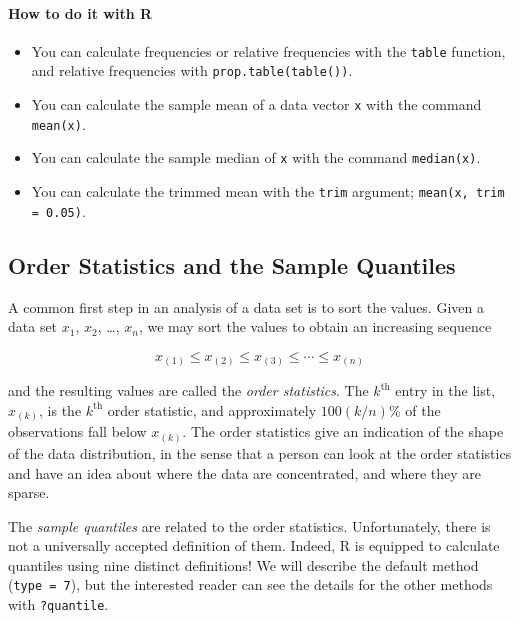 \documentclass[captions=tableheading]{scrbook}
\begin{document}
\paragraph*{How to do it with \textsf{R}}

\begin{itemize}
\item You can calculate frequencies or relative frequencies with the \texttt{table} function, and relative frequencies with \texttt{prop.table(table())}. \item You can calculate the sample mean of a data vector \texttt{x} with the command \texttt{mean(x)}.
\item You can calculate the sample median of \texttt{x} with the command \texttt{median(x)}. \item You can calculate the trimmed mean with the \texttt{trim} argument; \texttt{mean(x, trim = 0.05)}.
\end{itemize}
\subsection{Order Statistics and the Sample Quantiles}
\label{sec-2-3-3}

\label{sub:Order-Statistics-and}

A common first step in an analysis of a data set is to sort the values. Given a data set \(x_{1}\), \(x_{2}\), \ldots{}, \(x_{n}\), we may sort the values to obtain an increasing sequence

\begin{equation} 
x_{(1)}\leq x_{(2)}\leq x_{(3)}\leq\cdots\leq x_{(n)}
\end{equation}

and the resulting values are called the \emph{order statistics}. The \(k^{\mathrm{th}}\) entry in the list, \(x_{(k)}\), is the \(k^{\mathrm{th}}\) order statistic, and approximately \(100(k/n)\)\% of the observations fall below \(x_{(k)}\). The order statistics give an indication of the shape of the data distribution, in the sense that a person can look at the order statistics and have an idea about where the data are concentrated, and where they are sparse.

The \emph{sample quantiles} are related to the order statistics. Unfortunately, there is not a universally accepted definition of them. Indeed, \textsf{R} is equipped to calculate quantiles using nine distinct definitions! We will describe the default method (\texttt{type = 7}), but the interested reader can see the details for the other methods with \texttt{?quantile}.
\end{document}
